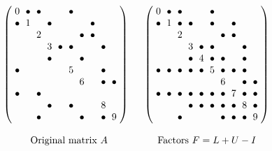 \begin{figure}[tbp]
  \newcommand{\s}{\space}
  \newcommand{\x}{\bullet}
  \newcommand{\f}{\circ}
  \begin{displaymath}
  \begin{array}{cc}
{\arraycolsep=3pt
\left(
\begin{array}{cccccccccc}
0  & \x & \x & \s & \s & \x & \s & \s & \s & \s \\
\x & 1  & \s & \x & \s & \s & \s & \x & \s & \s \\
\s & \s & 2  & \s & \s & \s & \x & \x & \s & \s \\
\s & \s & \s & 3  & \x & \x & \s & \s & \x & \s \\
\s & \s & \s & \x & \s & \s & \x & \s & \s & \s \\
\x & \s & \s & \s & \s & 5  & \s & \s & \x & \s \\
\s & \s & \s & \s & \s & \s & 6  & \s & \x & \x \\
\x & \s & \x & \s & \s & \s & \s & \s & \s & \s \\
\s & \s & \s & \x & \s & \x & \s & \s & 8  & \s \\
\s & \s & \x & \s & \s & \s & \x & \s & \x & 9
\end{array}
\right)  }  \:\:\: &
{\arraycolsep=3pt
\left(
\begin{array}{cccccccccc}
0  & \x & \x & \s & \s & \x & \s & \s & \s & \s \\
\x & 1  & \x & \x & \s & \x & \s & \x & \s & \s \\
\s & \s & 2  & \s & \s & \s & \x & \x & \s & \s \\
\s & \s & \s & 3  & \x & \x & \s & \s & \x & \s \\
\s & \s & \s & \x & 4  & \x & \x & \s & \x & \s \\
\x & \x & \x & \x & \x & 5  & \x & \x & \x & \s \\
\s & \s & \s & \s & \s & \s & 6  & \s & \x & \x \\
\x & \x & \x & \x & \x & \x & \x & 7  & \x & \x \\
\s & \s & \s & \x & \x & \x & \x & \x & 8  & \x \\
\s & \s & \x & \s & \s & \s & \x & \x & \x & 9
\end{array}
\right)  }  \\
  \: & \: \\
  \mbox{Original matrix $A$} & \mbox{Factors $F=L+U-I$} \\
  \end{array}
  \end{displaymath}


\end{figure}
